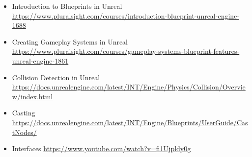 \documentclass{../../../fal_assignment}
\begin{document}
\begin{itemize}
  \item Introduction to Blueprints in Unreal \url{https://www.pluralsight.com/courses/introduction-blueprint-unreal-engine-1688}
  \item Creating Gameplay Systems in Unreal \url{https://www.pluralsight.com/courses/gameplay-systems-blueprint-features-unreal-engine-1861}
  \item Collision Detection in Unreal \url{https://docs.unrealengine.com/latest/INT/Engine/Physics/Collision/Overview/index.html}
  \item Casting \url{https://docs.unrealengine.com/latest/INT/Engine/Blueprints/UserGuide/CastNodes/}
  \item Interfaces \url{https://www.youtube.com/watch?v=fi1Ujpldy0g}
\end{itemize}
\end{document}
